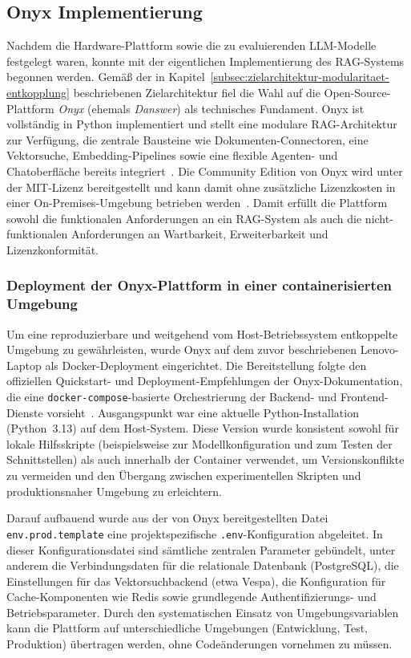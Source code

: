 \subsection{Onyx Implementierung}
\label{subsec:onyx-implementierung}

Nachdem die Hardware-Plattform sowie die zu evaluierenden LLM-Modelle festgelegt waren, konnte mit der eigentlichen Implementierung des RAG-Systems begonnen werden.
Gemäß der in Kapitel~\ref{subsec:zielarchitektur-modularitaet-entkopplung} beschriebenen Zielarchitektur fiel die Wahl auf die Open-Source-Plattform \textit{Onyx} (ehemals \textit{Danswer}) als technisches Fundament.
Onyx ist vollständig in Python implementiert und stellt eine modulare RAG-Architektur zur Verfügung, die zentrale Bausteine wie Dokumenten-Connectoren, eine Vektorsuche, Embedding-Pipelines sowie eine flexible Agenten- und Chatoberfläche bereits integriert~\cite{onyx_github}.
Die Community Edition von Onyx wird unter der MIT-Lizenz bereitgestellt und kann damit ohne zusätzliche Lizenzkosten in einer On-Premises-Umgebung betrieben werden~\cite{onyx_foss}.
Damit erfüllt die Plattform sowohl die funktionalen Anforderungen an ein RAG-System als auch die nicht-funktionalen Anforderungen an Wartbarkeit, Erweiterbarkeit und Lizenzkonformität.

\subsubsection{Deployment der Onyx-Plattform in einer containerisierten Umgebung}

Um eine reproduzierbare und weitgehend vom Host-Betriebssystem entkoppelte Umgebung zu gewährleisten, wurde Onyx auf dem zuvor beschriebenen Lenovo-Laptop als Docker-Deployment eingerichtet.
Die Bereitstellung folgte den offiziellen Quickstart- und Deployment-Empfehlungen der Onyx-Dokumentation, die eine \texttt{docker-compose}-basierte Orchestrierung der Backend- und Frontend-Dienste vorsieht~\cite{onyx_github}.
Ausgangspunkt war eine aktuelle Python-Installation (Python~3.13) auf dem Host-System.
Diese Version wurde konsistent sowohl für lokale Hilfsskripte (beispielsweise zur Modellkonfiguration und zum Testen der Schnittstellen) als auch innerhalb der Container verwendet, um Versionskonflikte zu vermeiden und den Übergang zwischen experimentellen Skripten und produktionsnaher Umgebung zu erleichtern.

Darauf aufbauend wurde aus der von Onyx bereitgestellten Datei \texttt{env.prod.template} eine projektspezifische \texttt{.env}-Konfiguration abgeleitet.
In dieser Konfigurationsdatei sind sämtliche zentralen Parameter gebündelt, unter anderem die Verbindungsdaten für die relationale Datenbank (PostgreSQL), die Einstellungen für das Vektorsuchbackend (etwa Vespa), die Konfiguration für Cache-Komponenten wie Redis sowie grundlegende Authentifizierungs- und Betriebsparameter.
Durch den systematischen Einsatz von Umgebungsvariablen kann die Plattform auf unterschiedliche Umgebungen (Entwicklung, Test, Produktion) übertragen werden, ohne Codeänderungen vornehmen zu müssen.

